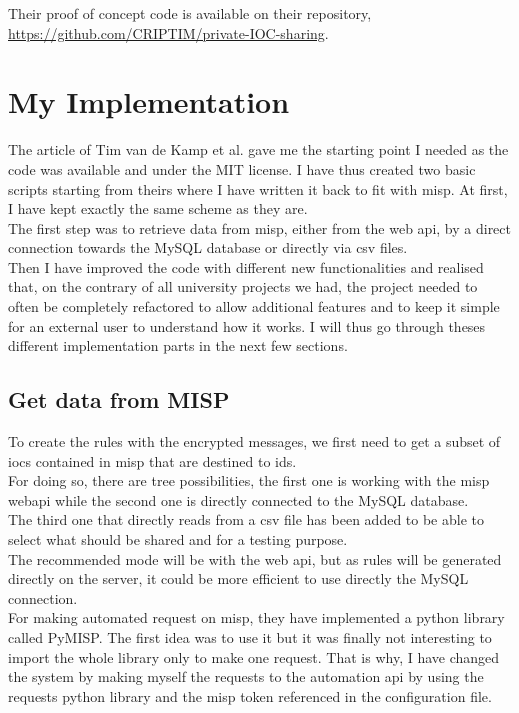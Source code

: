 \documentclass{eplmastersthesis}
\begin{document}
Their proof of concept code is available on their repository, \url{https://github.com/CRIPTIM/private-IOC-sharing}. 


\section{My Implementation}
The article of Tim van de Kamp et al. gave me the starting point I needed as the code was available and under the MIT license. I have thus created two basic scripts starting from theirs where I have written it back to fit with \gls{misp}. At first, I have kept exactly the same scheme as they are.\\
The first step was to retrieve data from \gls{misp}, either from the web \gls{api}, by a direct connection towards the MySQL database or directly via \gls{csv} files.\\
Then I have improved the code with different new functionalities and realised that, on the contrary of all university projects we had, the project needed to often be completely refactored to allow additional features and to keep it simple for an external user to understand how it works. I will thus go through theses different implementation parts in the next few sections.\\

\subsection{Get data from MISP}
To create the rules with the encrypted messages, we first need to get a subset of \gls{ioc}s contained in \gls{misp} that are destined to \gls{ids}. \\
For doing so, there are tree possibilities, the first one is working with the \gls{misp} web\gls{api} while the second one is directly connected to the MySQL database. \\
The third one that directly reads from a \gls{csv} file has been added to be able to select what should be shared and for a testing purpose.\\
The recommended mode will be with the web \gls{api}, but as rules will be generated directly on the server, it could be more efficient to use directly the MySQL connection.\\

For making automated request on \gls{misp}, they have implemented a python library called PyMISP. The first idea was to use it but it was finally not interesting to import the whole library only to make one request. That is why, I have changed the system by making myself the requests to the automation \gls{api} by using the requests python library and the \gls{misp} token referenced in the configuration file.\\
\end{document}
